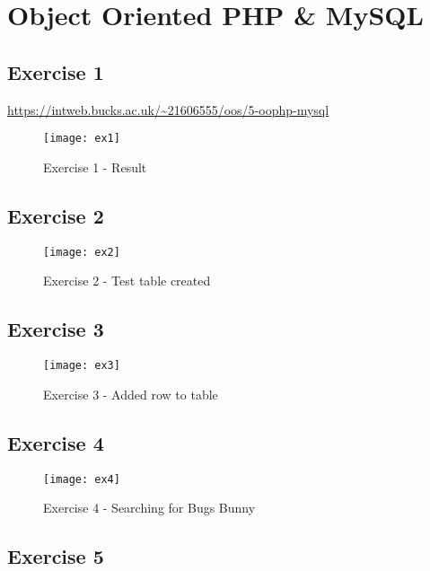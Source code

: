 \chapter{Object Oriented PHP \& MySQL}
\graphicspath{{5-oophp-mysql/images/}}

\section{Exercise 1}

\url{https://intweb.bucks.ac.uk/~21606555/oos/5-oophp-mysql}

\captionsetup{type=figure}


\captionsetup{type=figure}


\begin{figure}[H]
  \caption{Exercise 1 - Result}
  \centering
  \texttt{[image: ex1]}
\end{figure}

\section{Exercise 2}

\begin{figure}[H]
  \caption{Exercise 2 - Test table created}
  \centering
  \texttt{[image: ex2]}
\end{figure}

\section{Exercise 3}

\begin{figure}[H]
  \caption{Exercise 3 - Added row to table}
  \centering
  \texttt{[image: ex3]}
\end{figure}

\section{Exercise 4}

\begin{figure}[H]
  \caption{Exercise 4 - Searching for Bugs Bunny}
  \centering
  \texttt{[image: ex4]}
\end{figure}

\section{Exercise 5}

